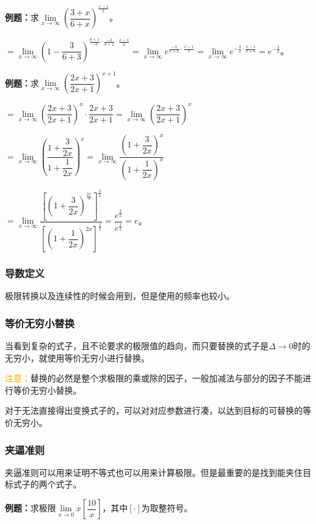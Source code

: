 \documentclass[UTF8, 12pt]{ctexart}
\begin{document}
\textbf{例题：}求$\lim\limits_{x\to\infty}\left(\dfrac{3+x}{6+x}\right)^{\frac{x-1}{2}}$。\medskip

$=\lim\limits_{x\to\infty}\left(1-\dfrac{3}{6+3}\right)^{\frac{6+x}{-3}\cdot\frac{-3}{6+x}\cdot\frac{x-1}{2}}=\lim\limits_{x\to\infty}e^{\frac{-3}{6+x}\cdot\frac{x-1}{2}}=\lim\limits_{x\to\infty}e^{-\frac{3}{2}\cdot\frac{x-1}{x+6}}=e^{-\frac{3}{2}}$。\medskip

\textbf{例题：}求$\lim\limits_{x\to\infty}\left(\dfrac{2x+3}{2x+1}\right)^{x+1}$。\medskip

$=\lim\limits_{x\to\infty}\left(\dfrac{2x+3}{2x+1}\right)^x\cdot\dfrac{2x+3}{2x+1}=\lim\limits_{x\to\infty}\left(\dfrac{2x+3}{2x+1}\right)^x$\medskip

$=\lim\limits_{x\to\infty}\left(\dfrac{1+\dfrac{3}{2x}}{1+\dfrac{1}{2x}}\right)^x=\lim\limits_{x\to\infty}\dfrac{\left(1+\dfrac{3}{2x}\right)^x}{\left(1+\dfrac{1}{2x}\right)^x}$

$=\lim\limits_{x\to\infty}\dfrac{\left[\left(1+\dfrac{3}{2x}\right)^{\frac{2x}{3}}\right]^{\frac{3}{2}}}{\left[\left(1+\dfrac{1}{2x}\right)^{2x}\right]^{\frac{1}{2}}}=\dfrac{e^{\frac{3}{2}}}{e^{\frac{1}{2}}}=e$。

\subsubsection{导数定义}

极限转换以及连续性的时候会用到，但是使用的频率也较小。

\subsubsection{等价无穷小替换}

当看到复杂的式子，且不论要求的极限值的趋向，而只要替换的式子是$\Delta\to 0$时的无穷小，就使用等价无穷小进行替换。

\textcolor{orange}{注意：}替换的必然是整个求极限的乘或除的因子，一般加减法与部分的因子不能进行等价无穷小替换。

对于无法直接得出变换式子的，可以对对应参数进行凑，以达到目标的可替换的等价无穷小。

\subsubsection{夹逼准则}

夹逼准则可以用来证明不等式也可以用来计算极限。但是最重要的是找到能夹住目标式子的两个式子。\medskip

\textbf{例题：}求极限$\lim\limits_{x\to 0}x\left[\dfrac{10}{x}\right]$，其中$[\cdot]$为取整符号。
\end{document}
